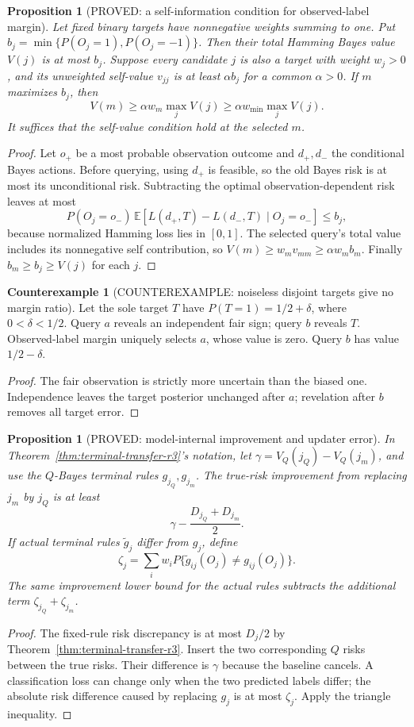 \documentclass[11pt]{article}
\newtheorem{proposition}[theorem]{Proposition}
\theoremstyle{definition}
\newtheorem{counterexample}[theorem]{Counterexample}
\theoremstyle{remark}
\begin{document}
\begin{proposition}[PROVED: a self-information condition for observed-label margin]
\label{prop:self-margin-r3}
Let fixed binary targets have nonnegative weights summing to one. Put
$b_j=\min\{P(O_j=1),P(O_j=-1)\}$. Then their total Hamming Bayes
value $V(j)$ is at most $b_j$. Suppose every candidate $j$ is also a target
with weight $w_j>0$, and its unweighted self-value $v_{jj}$ is at least
$\alpha b_j$ for a common $\alpha>0$. If $m$ maximizes $b_j$, then
\[
 V(m)\ge \alpha w_m\max_j V(j)\ge\alpha w_{\min}\max_j V(j).
\]
It suffices that the self-value condition hold at the selected $m$.
\end{proposition}
\begin{proof}
Let $o_+$ be a most probable observation outcome and $d_+,d_-$ the
conditional Bayes actions. Before querying, using $d_+$ is feasible,
so the old Bayes risk is at most its unconditional risk. Subtracting the
optimal observation-dependent risk leaves at most
\[
 P(O_j=o_-)\,
 \mathbb E[L(d_+,T)-L(d_-,T)\mid O_j=o_-]\le b_j,
\]
because normalized Hamming loss lies in $[0,1]$.
The selected query's total value includes its nonnegative self contribution,
so $V(m)\ge w_m v_{mm}\ge\alpha w_m b_m$. Finally
$b_m\ge b_j\ge V(j)$ for each $j$.
\end{proof}

\begin{counterexample}[COUNTEREXAMPLE: noiseless disjoint targets give no margin ratio]
Let the sole target $T$ have $P(T=1)=1/2+\delta$, where $0<\delta<1/2$.
Query $a$ reveals an independent fair sign; query $b$ reveals $T$.
Observed-label margin uniquely selects $a$, whose value is zero.
Query $b$ has value $1/2-\delta$.
\end{counterexample}
\begin{proof}
The fair observation is strictly more uncertain than the biased one.
Independence leaves the target posterior unchanged after $a$; revelation
after $b$ removes all target error.
\end{proof}

\begin{proposition}[PROVED: model-internal improvement and updater error]
\label{prop:improvement-r3}
In Theorem~\ref{thm:terminal-transfer-r3}'s notation, let
$\gamma=V_Q(j_Q)-V_Q(j_m)$, and use the $Q$-Bayes terminal rules
$g_{j_Q},g_{j_m}$. The true-risk improvement from replacing $j_m$ by
$j_Q$ is at least
\[
 \gamma-\frac{D_{j_Q}+D_{j_m}}2.
\]
If actual terminal rules $\widetilde g_j$ differ from $g_j$, define
\[
 \zeta_j=\sum_iw_iP\{\widetilde g_{ij}(O_j)\ne g_{ij}(O_j)\}.
\]
The same improvement lower bound for the actual rules subtracts the
additional term $\zeta_{j_Q}+\zeta_{j_m}$.
\end{proposition}
\begin{proof}
The fixed-rule risk discrepancy is at most $D_j/2$ by
Theorem~\ref{thm:terminal-transfer-r3}. Insert the two corresponding
$Q$ risks between the true risks. Their difference is $\gamma$ because
the baseline cancels. A classification loss can change only when the
two predicted labels differ; the absolute risk difference caused by
replacing $g_j$ is at most $\zeta_j$. Apply the triangle inequality.
\end{proof}
\end{document}
